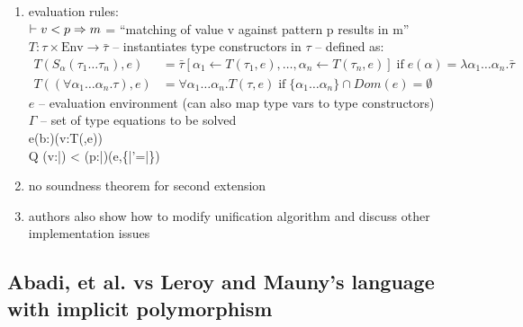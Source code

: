 \documentclass[12pt]{article}	%
\begin{document}
\begin{enumerate}
	\item evaluation rules:\\
	$\vdash v < p \Rightarrow m$ = ``matching of value v against pattern p results in m'' \\
	$T:\tau\times\textrm{Env}\rightarrow\bar{\tau}$ -- instantiates type constructors in $\tau$ -- defined as:
	\begin{align*}
	T(S_\alpha(\tau_1\ldots\tau_n),e) &= \bar{\tau}[\alpha_1\leftarrow T(\tau_1,e),\ldots,\alpha_n\leftarrow T(\tau_n,e)] \;\textrm{if}\; e(\alpha) = \lambda\alpha_1\ldots\alpha_n.\bar{\tau} \\
	T((\forall\alpha_1\ldots\alpha_n.\tau),e) &= \forall\alpha_1\ldots\alpha_n.T(\tau,e) \;\textrm{if}\; \{\alpha_1\ldots\alpha_n\}\cap Dom(e) = \emptyset
	\end{align*}
	$e$ -- evaluation environment (can also map type vars to type constructors) \\
	$\Gamma$ -- set of type equations to be solved \\
	          {e\vdash \dynamic(b:\sigma)\eval \dynamic(v:T(\sigma,e))} \\
	          {Q \vdash \dynamic(v:\bar{\sigma}) < \dynamic(p:\bar{\tau})\eval (e,\Gamma\cup\{\bar{\tau}'=\bar{\tau}\})}
	
	\item no soundness theorem for second extension
	
	\item authors also show how to modify unification algorithm and discuss other implementation issues
	
	 \end{enumerate}

\subsection*{Abadi, et al. vs Leroy and Mauny's \Dynamic language with implicit polymorphism}
\end{document}

